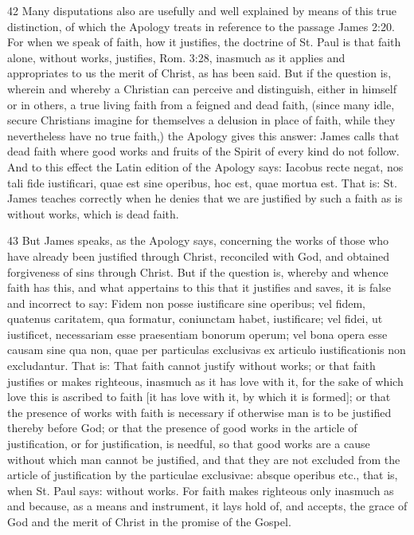 42 Many disputations also are usefully and well explained by means of this true distinction, of which the Apology treats in reference to the passage James 2:20. For when we speak of faith, how it justifies, the doctrine of St. Paul is that faith alone, without works, justifies, Rom. 3:28, inasmuch as it applies and appropriates to us the merit of Christ, as has been said. But if the question is, wherein and whereby a Christian can perceive and distinguish, either in himself or in others, a true living faith from a feigned and dead faith, (since many idle, secure Christians imagine for themselves a delusion in place of faith, while they nevertheless have no true faith,) the Apology gives this answer: James calls that dead faith where good works and fruits of the Spirit of every kind do not follow. And to this effect the Latin edition of the Apology says: Iacobus recte negat, nos tali fide iustificari, quae est sine operibus, hoc est, quae mortua est. That is: St. James teaches correctly when he denies that we are justified by such a faith as is without works, which is dead faith.

43 But James speaks, as the Apology says, concerning the works of those who have already been justified through Christ, reconciled with God, and obtained forgiveness of sins through Christ. But if the question is, whereby and whence faith has this, and what appertains to this that it justifies and saves, it is false and incorrect to say: Fidem non posse iustificare sine operibus; vel fidem, quatenus caritatem, qua formatur, coniunctam habet, iustificare; vel fidei, ut iustificet, necessariam esse praesentiam bonorum operum; vel bona opera esse causam sine qua non, quae per particulas exclusivas ex articulo iustificationis non excludantur. That is: That faith cannot justify without works; or that faith justifies or makes righteous, inasmuch as it has love with it, for the sake of which love this is ascribed to faith [it has love with it, by which it is formed]; or that the presence of works with faith is necessary if otherwise man is to be justified thereby before God; or that the presence of good works in the article of justification, or for justification, is needful, so that good works are a cause without which man cannot be justified, and that they are not excluded from the article of justification by the particulae exclusivae: absque operibus etc., that is, when St. Paul says: without works. For faith makes righteous only inasmuch as and because, as a means and instrument, it lays hold of, and accepts, the grace of God and the merit of Christ in the promise of the Gospel.

